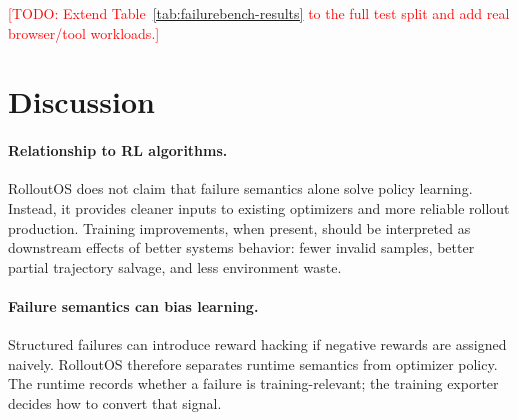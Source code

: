 \documentclass{article}
\newcommand{\sys}{RolloutOS}
\newcommand{\todo}[1]{\textcolor{red}{[TODO: #1]}}
\begin{document}
\begin{table}[t]
\centering
\scriptsize
\resizebox{\linewidth}{!}{%

}
\caption{MiniWoB browser contract results on 20 tasks $\times$ 5 seeds. The
contract harness quantifies browser-runtime failure handling before attaching
the same adapter interface to live MiniWoB++ pages.}
\label{tab:miniwob-contract-results}
\end{table}

\begin{table}[t]
\centering
{}
\caption{Evaluation plan for a systems-focused MLSys submission.}
\label{tab:eval-plan}
\end{table}

\todo{Extend Table~\ref{tab:failurebench-results} to the full test split and add
real browser/tool workloads.}

\section{Discussion}

\paragraph{Relationship to RL algorithms.}
\sys{} does not claim that failure semantics alone solve policy learning.
Instead, it provides cleaner inputs to existing optimizers and more reliable rollout production.
Training improvements, when present, should be interpreted as downstream effects of better systems behavior: fewer invalid samples, better partial trajectory salvage, and less environment waste.

\paragraph{Failure semantics can bias learning.}
Structured failures can introduce reward hacking if negative rewards are assigned naively.
\sys{} therefore separates runtime semantics from optimizer policy.
The runtime records whether a failure is training-relevant; the training exporter decides how to convert that signal.
\end{document}
